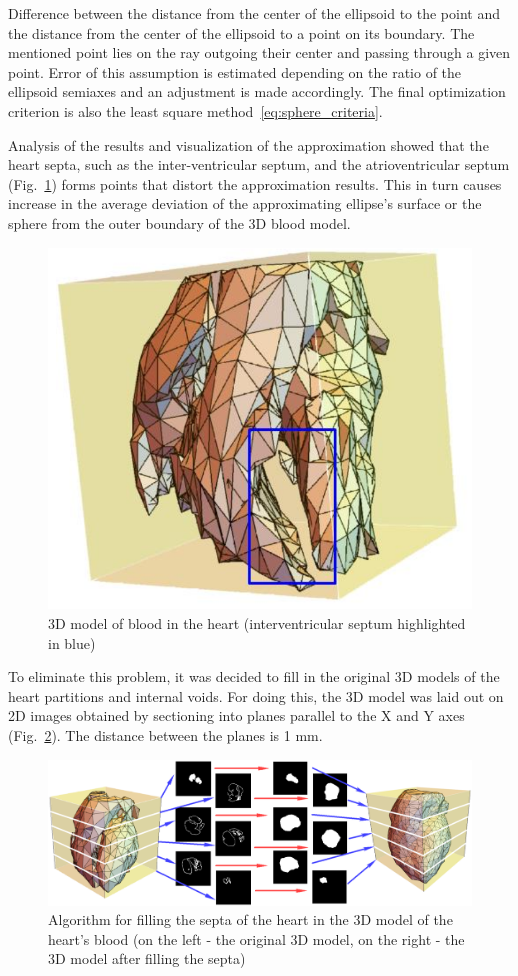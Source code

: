 \documentclass[conference]{IEEEtran}
\begin{document}
Difference between the distance from the center of the ellipsoid to the point and the distance from the center of the ellipsoid to a point on its boundary.
The mentioned point lies on the ray outgoing their center and passing through a given point.
Error of this assumption is estimated depending on the ratio of the ellipsoid semiaxes and an adjustment is made accordingly.
The final optimization criterion is also the least square method~\ref{eq:sphere_criteria}.

Analysis of the results and visualization of the approximation showed that the heart septa, such as the inter-ventricular septum, and the atrioventricular septum
(Fig.~\ref{fig:wall})
forms points that distort the approximation results.
This in turn causes increase in the average deviation of the approximating ellipse's surface or the sphere from the outer boundary of the 3D blood model.
\begin{figure}[tbph]
    \centering
    \includegraphics[width=0.55\linewidth]{fig/wall}
    \caption{3D model of blood in the heart (interventricular septum highlighted in blue)}
    \label{fig:wall}
\end{figure}
To eliminate this problem, it was decided to fill in the original 3D models of the heart partitions and internal voids.
For doing this, the 3D model was laid out on 2D images obtained by sectioning into planes parallel to the X and Y axes (Fig.~\ref{fig:algo}).
The distance between the planes is 1 mm.

\begin{figure}[tbph]
    \centering
    \includegraphics[width=\linewidth]{fig/algo}
    \caption{Algorithm for filling the septa of the heart in the 3D model of the heart's blood
    (on the left - the original 3D model, on the right - the 3D model after filling the septa)}
    \label{fig:algo}
\end{figure}
\end{document}
